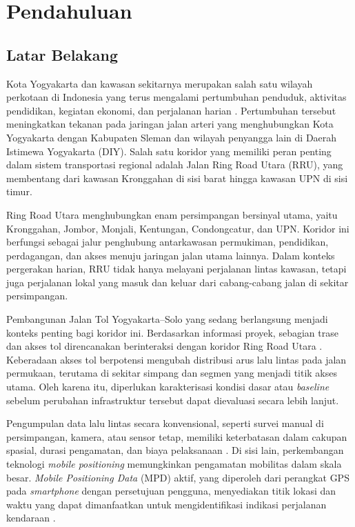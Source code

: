 \chapter{Pendahuluan}

\section{Latar Belakang}

Kota Yogyakarta dan kawasan sekitarnya merupakan salah satu wilayah perkotaan di Indonesia yang terus mengalami pertumbuhan penduduk, aktivitas pendidikan, kegiatan ekonomi, dan perjalanan harian \cite{bps_sleman_2024,bps_diy_2024}. Pertumbuhan tersebut meningkatkan tekanan pada jaringan jalan arteri yang menghubungkan Kota Yogyakarta dengan Kabupaten Sleman dan wilayah penyangga lain di Daerah Istimewa Yogyakarta (DIY). Salah satu koridor yang memiliki peran penting dalam sistem transportasi regional adalah Jalan Ring Road Utara (RRU), yang membentang dari kawasan Kronggahan di sisi barat hingga kawasan UPN di sisi timur.

Ring Road Utara menghubungkan enam persimpangan bersinyal utama, yaitu Kronggahan, Jombor, Monjali, Kentungan, Condongcatur, dan UPN. Koridor ini berfungsi sebagai jalur penghubung antarkawasan permukiman, pendidikan, perdagangan, dan akses menuju jaringan jalan utama lainnya. Dalam konteks pergerakan harian, RRU tidak hanya melayani perjalanan lintas kawasan, tetapi juga perjalanan lokal yang masuk dan keluar dari cabang-cabang jalan di sekitar persimpangan.

Pembangunan Jalan Tol Yogyakarta--Solo yang sedang berlangsung \cite{pupr_groundbreaking_ygs,kompas_tol_ygs_2024} menjadi konteks penting bagi koridor ini. Berdasarkan informasi proyek, sebagian trase dan akses tol direncanakan berinteraksi dengan koridor Ring Road Utara \cite{bpjt_tol_ygs,perpres_ygs_2018}. Keberadaan akses tol berpotensi mengubah distribusi arus lalu lintas pada jalan permukaan, terutama di sekitar simpang dan segmen yang menjadi titik akses utama. Oleh karena itu, diperlukan karakterisasi kondisi dasar atau \textit{baseline} sebelum perubahan infrastruktur tersebut dapat dievaluasi secara lebih lanjut.

Pengumpulan data lalu lintas secara konvensional, seperti survei manual di persimpangan, kamera, atau sensor tetap, memiliki keterbatasan dalam cakupan spasial, durasi pengamatan, dan biaya pelaksanaan \cite{quddus2007}. Di sisi lain, perkembangan teknologi \textit{mobile positioning} memungkinkan pengamatan mobilitas dalam skala besar. \textit{Mobile Positioning Data} (MPD) aktif, yang diperoleh dari perangkat GPS pada \textit{smartphone} dengan persetujuan pengguna, menyediakan titik lokasi dan waktu yang dapat dimanfaatkan untuk mengidentifikasi indikasi perjalanan kendaraan \cite{calabrese2013}.

